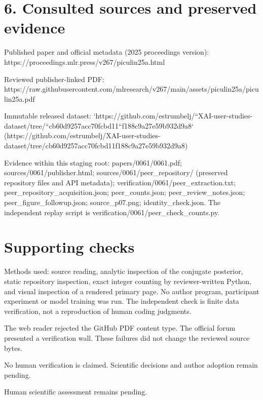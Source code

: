 \documentclass[10pt]{article}
\begin{document}
\section*{6. Consulted sources and preserved evidence}
Published paper and official metadata (2025 proceedings version): https://proceedings.mlr.press/v267/piculin25a.html\par
Reviewed publisher-linked PDF: https://raw.githubusercontent.com/mlresearch/v267/main/assets/piculin25a/piculin25a.pdf\par
Immutable released dataset: `https://github.com/estrumbelj/``XAI-user-studies-dataset/tree/``cb60d9257acc70fcbd11``f188c9a27e59b932d9a8` (https://github.com/estrumbelj/XAI-user-studies-dataset/tree/cb60d9257acc70fcbd11f188c9a27e59b932d9a8)\par
Evidence within this staging root: papers/0061/0061.pdf; sources/0061/publisher.html; sources/0061/peer\_repository/ (preserved repository files and API metadata); verification/0061/peer\_extraction.txt; peer\_repository\_acquisition.json; peer\_counts.json; peer\_review\_notes.json; peer\_figure\_followup.json; source\_p07.png; identity\_check.json. The independent replay script is verification/0061/peer\_check\_counts.py.\par
\section*{Supporting checks}
Methods used: source reading, analytic inspection of the conjugate posterior, static repository inspection, exact integer counting by reviewer-written Python, and visual inspection of a rendered primary page. No author program, participant experiment or model training was run. The independent check is finite data verification, not a reproduction of human coding judgments.\par
The web reader rejected the GitHub PDF content type. The official forum presented a verification wall. These failures did not change the reviewed source bytes.\par
No human verification is claimed. Scientific decisions and author adoption remain pending.\par
Human scientific assessment remains pending.\par
\end{document}
